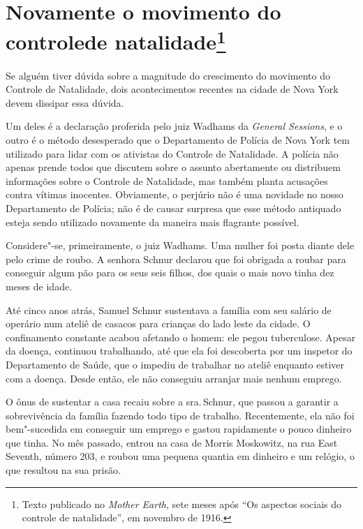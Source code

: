 \chapter[Novamente o movimento do controle de natalidade]{Novamente o movimento do controle\break de natalidade\footnote{Texto publicado
  no \emph{Mother Earth}, sete meses após ``Os aspectos sociais do
  controle de natalidade'', em novembro de 1916.}}

Se alguém tiver dúvida sobre a magnitude do crescimento do movimento do
Controle de Natalidade, dois acontecimentos recentes na cidade de Nova
York devem dissipar essa dúvida.

Um deles é a declaração proferida pelo juiz Wadhams da \emph{General
Sessions}, e o outro é o método desesperado que o Departamento de
Polícia de Nova York tem utilizado para lidar com os ativistas do
Controle de Natalidade. A polícia não apenas prende todos que discutem
sobre o assunto abertamente ou distribuem informações sobre o Controle
de Natalidade, mas também planta acusações contra vítimas inocentes.
Obviamente, o perjúrio não é uma novidade no nosso Departamento de
Polícia; não é de causar surpresa que esse método antiquado esteja sendo
utilizado novamente da maneira mais flagrante possível.

Considere"-se, primeiramente, o juiz Wadhams. Uma mulher foi posta diante
dele pelo crime de roubo. A senhora Schnur declarou que foi obrigada a
roubar para conseguir algum pão para os seus seis filhos, dos quais o
mais novo tinha dez meses de idade.

Até cinco anos atrás, Samuel Schnur sustentava a família com seu
salário de operário num ateliê de casacos para crianças do lado leste da
cidade. O confinamento constante acabou afetando o homem: ele pegou
tuberculose. Apesar da doença, continuou trabalhando, até que ela foi
descoberta por um inspetor do Departamento de Saúde, que o impediu de
trabalhar no ateliê enquanto estiver com a doença. Desde então, ele não
conseguiu arranjar mais nenhum emprego.

O ônus de sustentar a casa recaiu sobre a sra.\,Schnur, que passou a
garantir a sobrevivência da família fazendo todo tipo de trabalho.
Recentemente, ela não foi bem"-sucedida em conseguir um emprego e gastou
rapidamente o pouco dinheiro que tinha. No mês passado, entrou na casa
de Morris Moskowitz, na rua East Seventh, número 203, e roubou uma
pequena quantia em dinheiro e um relógio, o que resultou na sua prisão.

